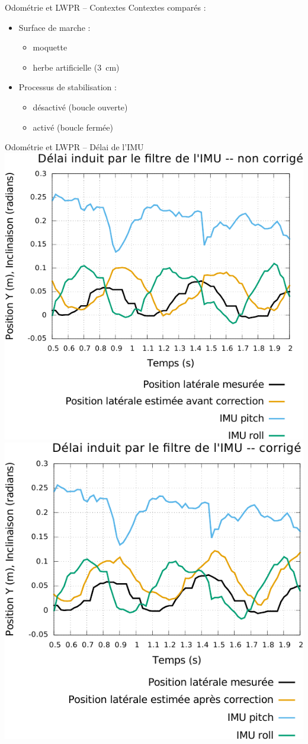 \begin{frame}[noframenumbering]{Odométrie et LWPR -- Contextes}
    Contextes comparés :
    \begin{itemize}
        \item Surface de marche : 
            \begin{itemize}
                \item moquette
                \item herbe artificielle ($3$~cm)
            \end{itemize}
        \item Processus de stabilisation : 
            \begin{itemize}
                \item désactivé (boucle ouverte)
                \item activé (boucle fermée)
            \end{itemize}
    \end{itemize}
\end{frame}

\begin{frame}[noframenumbering]{Odométrie et LWPR -- Délai de l'IMU}
    \centering
    \includegraphics[type=pdf,ext=.pdf,read=.pdf,width=0.5\linewidth]{../plot/OdometryLWPR/grass_open_delay_imu_uncorrected}
    \includegraphics[type=pdf,ext=.pdf,read=.pdf,width=0.5\linewidth]{../plot/OdometryLWPR/grass_open_delay_imu_corrected}
\end{frame}

